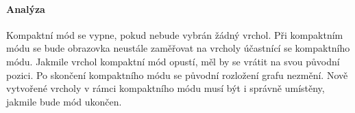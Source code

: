 \paragraph{Analýza} Kompaktní mód se vypne, pokud nebude vybrán žádný vrchol. Při kompaktním módu se bude obrazovka neustále zaměřovat na vrcholy účastnící se kompaktního módu. Jakmile vrchol kompaktní mód opustí, měl by se vrátit na svou původní pozici. Po skončení kompaktního módu se původní rozložení grafu nezmění. Nově vytvořené vrcholy v rámci kompaktního módu musí být i správně umístěny, jakmile bude mód ukončen.
